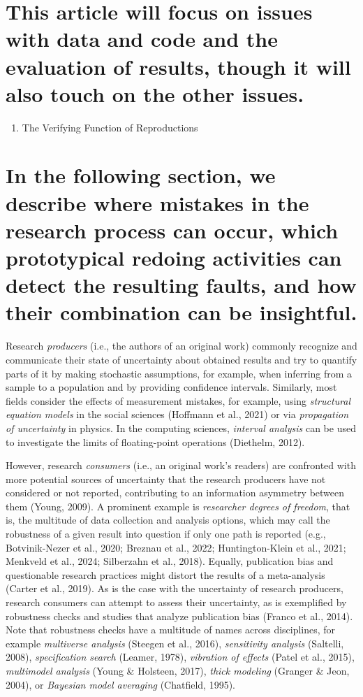 \documentclass[authordate, empirical]{jote-new-article}
\begin{document}
	\section{This article will focus on issues with data and code and the evaluation of results, though it will also touch on the other issues.}

	\begin{enumerate}


		\item The Verifying Function of Reproductions


	\end{enumerate}

	\section{In the following section, we describe where mistakes in the research process can occur, which prototypical redoing activities can detect the resulting faults, and how their combination can be insightful.}



	Research \emph{producers} (i.e., the authors of an original work) commonly recognize and communicate their state of uncertainty about obtained results and try to quantify parts of it by making stochastic assumptions, for example, when inferring from a sample to a population and by providing confidence intervals. Similarly, most fields consider the effects of measurement mistakes, for example, using \emph{structural equation models} in the social sciences (Hoffmann et al., 2021) or via \emph{propagation of uncertainty }in physics. In the computing sciences, \emph{interval analysis} can be used to investigate the limits of floating-point operations (Diethelm, 2012).



	However, research \emph{consumers} (i.e., an original work's readers) are confronted with more potential sources of uncertainty that the research producers have not considered or not reported, contributing to an information asymmetry between them (Young, 2009). A prominent example is \emph{researcher degrees of freedom}, that is, the multitude of data collection and analysis options, which may call the robustness of a given result into question if only one path is reported (e.g., Botvinik-Nezer et al., 2020; Breznau et al., 2022; Huntington-Klein et al., 2021; Menkveld et al., 2024; Silberzahn et al., 2018). Equally, publication bias and questionable research practices might distort the results of a meta-analysis (Carter et al., 2019). As is the case with the uncertainty of research producers, research consumers can attempt to assess their uncertainty, as is exemplified by robustness checks and studies that analyze publication bias (Franco et al., 2014). Note that robustness checks have a multitude of names across disciplines, for example \emph{multiverse analysis} (Steegen et al., 2016), \emph{sensitivity analysis} (Saltelli, 2008), \emph{specification search} (Leamer, 1978), \emph{vibration of effects} (Patel et al., 2015), \emph{multimodel analysis} (Young \& Holsteen, 2017), \emph{thick modeling} (Granger \& Jeon, 2004), or \emph{Bayesian model averaging} (Chatfield, 1995).
\end{document}
